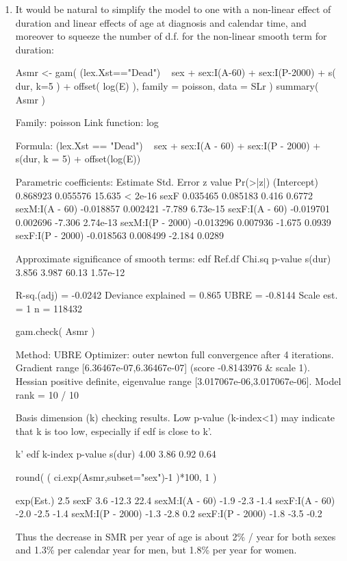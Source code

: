 \begin{enumerate}[resume]
  
\item It would be natural to simplify the model to one with a non-linear
  effect of duration and linear effects of age at diagnosis and
  calendar time, and moreover to squeeze the number of d.f. for the
  non-linear smooth term for duration:
\begin{Schunk}
\begin{Sinput}
 Asmr <- gam( (lex.Xst=="Dead") ~ sex +
                                  sex:I(A-60) + 
                                  sex:I(P-2000) +
                                  s( dur, k=5 ) +
                                  offset( log(E) ),
              family = poisson,
                data = SLr )
 summary( Asmr )
\end{Sinput}
\begin{Soutput}
Family: poisson 
Link function: log 

Formula:
(lex.Xst == "Dead") ~ sex + sex:I(A - 60) + sex:I(P - 2000) + 
    s(dur, k = 5) + offset(log(E))

Parametric coefficients:
                  Estimate Std. Error z value Pr(>|z|)
(Intercept)       0.868923   0.055576  15.635  < 2e-16
sexF              0.035465   0.085183   0.416   0.6772
sexM:I(A - 60)   -0.018857   0.002421  -7.789 6.73e-15
sexF:I(A - 60)   -0.019701   0.002696  -7.306 2.74e-13
sexM:I(P - 2000) -0.013296   0.007936  -1.675   0.0939
sexF:I(P - 2000) -0.018563   0.008499  -2.184   0.0289

Approximate significance of smooth terms:
         edf Ref.df Chi.sq  p-value
s(dur) 3.856  3.987  60.13 1.57e-12

R-sq.(adj) =  -0.0242   Deviance explained = 0.865%
UBRE = -0.8144  Scale est. = 1         n = 118432
\end{Soutput}
\begin{Sinput}
 gam.check( Asmr )
\end{Sinput}
\begin{Soutput}
Method: UBRE   Optimizer: outer newton
full convergence after 4 iterations.
Gradient range [6.36467e-07,6.36467e-07]
(score -0.8143976 & scale 1).
Hessian positive definite, eigenvalue range [3.017067e-06,3.017067e-06].
Model rank =  10 / 10 

Basis dimension (k) checking results. Low p-value (k-index<1) may
indicate that k is too low, especially if edf is close to k'.

         k'  edf k-index p-value
s(dur) 4.00 3.86    0.92    0.64
\end{Soutput}
\begin{Sinput}
 round( ( ci.exp(Asmr,subset="sex")-1 )*100, 1 )
\end{Sinput}
\begin{Soutput}
                 exp(Est.)  2.5% 97.5%
sexF                   3.6 -12.3  22.4
sexM:I(A - 60)        -1.9  -2.3  -1.4
sexF:I(A - 60)        -2.0  -2.5  -1.4
sexM:I(P - 2000)      -1.3  -2.8   0.2
sexF:I(P - 2000)      -1.8  -3.5  -0.2
\end{Soutput}
\end{Schunk}
Thus the decrease in SMR per year of age is about 2\% / year for both
sexes and 1.3\% per calendar year for men, but 1.8\% per year for women.


\end{enumerate}
